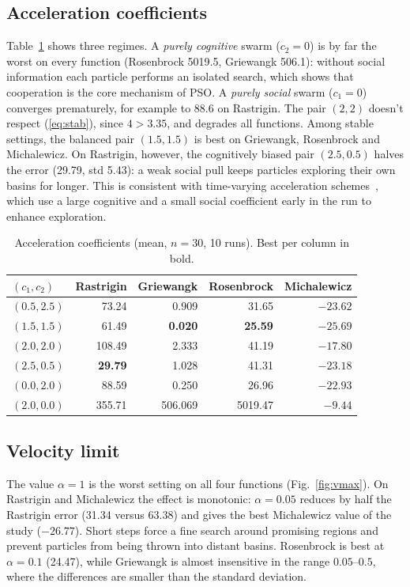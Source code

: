 \documentclass[conference]{IEEEtran}
\begin{document}
\subsection{Acceleration coefficients}
Table~\ref{tab:c} shows three regimes. A \emph{purely cognitive} swarm
($c_2=0$) is by far the worst on every function (Rosenbrock 5019.5,
Griewangk 506.1): without social information each particle performs an
isolated search, which shows that cooperation is the core mechanism of
PSO. A \emph{purely social} swarm ($c_1=0$) converges prematurely, for
example to 88.6 on Rastrigin. The pair $(2,2)$ doesn't respect (\ref{eq:stab}),
since $4>3.35$, and degrades all functions. Among stable settings, the
balanced pair $(1.5,1.5)$ is best on Griewangk, Rosenbrock and Michalewicz.
On Rastrigin, however, the cognitively biased pair $(2.5,0.5)$ halves the
error (29.79, std 5.43): a weak social pull keeps particles exploring their
own basins for longer. This is consistent with time-varying acceleration
schemes~\cite{ratnaweera2004}, which use a large cognitive and a small
social coefficient early in the run to enhance exploration.

\begin{table}[t]
\centering
\caption{Acceleration coefficients (mean, $n=30$, 10 runs). Best per
column in bold.}
\label{tab:c}
\setlength{\tabcolsep}{4pt}
\begin{tabular}{lrrrr}
\toprule
$(c_1,c_2)$ & Rastrigin & Griewangk & Rosenbrock & Michalewicz\\
\midrule
$(0.5,2.5)$ & 73.24 & 0.909 & 31.65 & $-23.62$\\
$(1.5,1.5)$ & 61.49 & \textbf{0.020} & \textbf{25.59} & $\mathbf{-25.69}$\\
$(2.0,2.0)$ & 108.49 & 2.333 & 41.19 & $-17.80$\\
$(2.5,0.5)$ & \textbf{29.79} & 1.028 & 41.31 & $-23.18$\\
$(0.0,2.0)$ & 88.59 & 0.250 & 26.96 & $-22.93$\\
$(2.0,0.0)$ & 355.71 & 506.069 & 5019.47 & $-9.44$\\
\bottomrule
\end{tabular}
\end{table}

\subsection{Velocity limit}
The value $\alpha=1$ is the worst setting on all four functions
(Fig.~\ref{fig:vmax}). On Rastrigin and Michalewicz the effect is
monotonic: $\alpha=0.05$ reduces by half the Rastrigin error (31.34 versus 63.38) and
gives the best Michalewicz value of the study ($-26.77$). Short steps force
a fine search around promising regions and prevent particles from being
thrown into distant basins. Rosenbrock is best at $\alpha=0.1$ (24.47),
while Griewangk is almost insensitive in the range $0.05$--$0.5$, where the
differences are smaller than the standard deviation.
\end{document}
